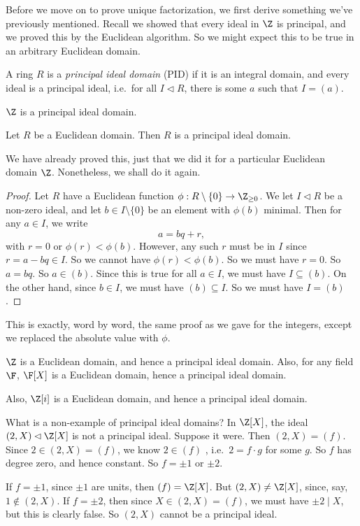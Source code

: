 \documentclass[a4paper]{article}
\begin{document}
Before we move on to prove unique factorization, we first derive something we've previously mentioned. Recall we showed that every ideal in $\Z$ is principal, and we proved this by the Euclidean algorithm. So we might expect this to be true in an arbitrary Euclidean domain.

\begin{defi}
  A ring $R$ is a \emph{principal ideal domain} (PID) if it is an integral domain, and every ideal is a principal ideal, i.e.\ for all $I \lhd R$, there is some $a$ such that $I = (a)$.
\end{defi}

\begin{eg}
  $\Z$ is a principal ideal domain.
\end{eg}

\begin{prop}
  Let $R$ be a Euclidean domain. Then $R$ is a principal ideal domain.
\end{prop}
We have already proved this, just that we did it for a particular Euclidean domain $\Z$. Nonetheless, we shall do it again.

\begin{proof}
  Let $R$ have a Euclidean function $\phi: R \setminus \{0\} \to \Z_{\geq 0}$. We let $I \lhd R$ be a non-zero ideal, and let $b \in I\setminus \{0\}$ be an element with $\phi(b)$ minimal. Then for any $a \in I$, we write
  \[
    a = bq + r,
  \]
  with $r = 0$ or $\phi(r) < \phi(b)$. However, any such $r$ must be in $I$ since $r = a - bq \in I$. So we cannot have $\phi(r) < \phi(b)$. So we must have $r = 0$. So $a = bq$. So $a \in (b)$. Since this is true for all $a \in I$, we must have $I \subseteq (b)$. On the other hand, since $b \in I$, we must have $(b) \subseteq I$. So we must have $I = (b)$.
\end{proof}
This is exactly, word by word, the same proof as we gave for the integers, except we replaced the absolute value with $\phi$.

\begin{eg}
  $\Z$ is a Euclidean domain, and hence a principal ideal domain. Also, for any field $\F$, $\F[X]$ is a Euclidean domain, hence a principal ideal domain.

  Also, $\Z[i]$ is a Euclidean domain, and hence a principal ideal domain.

  What is a non-example of principal ideal domains? In $\Z[X]$, the ideal $(2, X) \lhd \Z[X]$ is not a principal ideal. Suppose it were. Then $(2, X) = (f)$. Since $2 \in (2, X) = (f)$, we know $2 \in (f)$ , i.e.\ $2 = f\cdot g$ for some $g$. So $f$ has degree zero, and hence constant. So $f = \pm 1$ or $\pm 2$.

  If $f = \pm 1$, since $\pm 1$ are units, then $(f) = \Z[X]$. But $(2, X) \not= \Z[X]$, since, say, $1 \not\in (2, X)$. If $f = \pm 2$, then since $X \in (2, X) = (f)$, we must have $\pm 2 \mid X$, but this is clearly false. So $(2, X)$ cannot be a principal ideal.
\end{eg}
\end{document}
